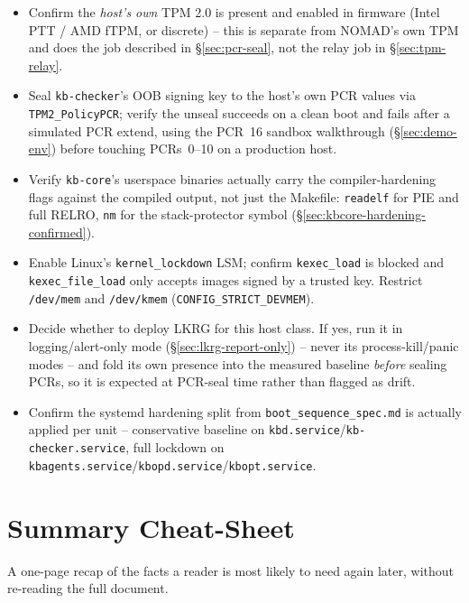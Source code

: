 \documentclass[11pt,a4paper]{article}
\begin{document}
\begin{itemize}[label=$\square$]
  \item Confirm the \emph{host's own} TPM 2.0 is present and enabled in
    firmware (Intel PTT / AMD fTPM, or discrete) -- this is separate
    from NOMAD's own TPM and does the job described in
    \S\ref{sec:pcr-seal}, not the relay job in \S\ref{sec:tpm-relay}.
  \item Seal \texttt{kb-checker}'s OOB signing key to the host's own
    PCR values via \texttt{TPM2\_PolicyPCR}; verify the unseal succeeds
    on a clean boot and fails after a simulated PCR extend, using the
    PCR~16 sandbox walkthrough (\S\ref{sec:demo-env}) before touching
    PCRs~0--10 on a production host.
  \item Verify \texttt{kb-core}'s userspace binaries actually carry the
    compiler-hardening flags against the compiled output, not just the
    Makefile: \texttt{readelf} for PIE and full RELRO, \texttt{nm} for
    the stack-protector symbol (\S\ref{sec:kbcore-hardening-confirmed}).
  \item Enable Linux's \texttt{kernel\_lockdown} LSM; confirm
    \texttt{kexec\_load} is blocked and \texttt{kexec\_file\_load}
    only accepts images signed by a trusted key. Restrict
    \texttt{/dev/mem} and \texttt{/dev/kmem}
    (\texttt{CONFIG\_STRICT\_DEVMEM}).
  \item Decide whether to deploy LKRG for this host class. If yes, run
    it in logging/alert-only mode (\S\ref{sec:lkrg-report-only}) --
    never its process-kill/panic modes -- and fold its own presence
    into the measured baseline \emph{before} sealing PCRs, so it is
    expected at PCR-seal time rather than flagged as drift.
  \item Confirm the systemd hardening split from
    \texttt{boot\_sequence\_spec.md} is actually applied per unit --
    conservative baseline on \texttt{kbd.service}/\texttt{kb-checker.service},
    full lockdown on \texttt{kbagents.service}/\texttt{kbopd.service}/\texttt{kbopt.service}.
\end{itemize}

\section{Summary Cheat-Sheet}
\label{sec:cheatsheet}

A one-page recap of the facts a reader is most likely to need again
later, without re-reading the full document.
\end{document}
